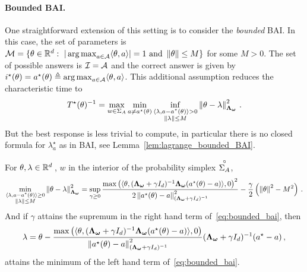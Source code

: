 \paragraph{Bounded BAI.}\label{sec:lgc.formulation.examples.bounded}
One straightforward extension of this setting is to consider the \emph{bounded} BAI. In this case, the set of parameters is $\mathcal{M}=\{\theta \in \mathbb{R}^d:\ |\operatorname*{arg\,max}_{a\in\mathcal{A}} \langle\theta,a\rangle|=1 \text{ and } \left\lVert\theta\right\rVert\leq M\}$ for some $M>0$. The set of possible answers is $\mathcal{I} = \mathcal{A}$ and the correct answer is given by $i^\star(\theta)=a^\star(\theta)\triangleq \operatorname*{arg\,max}_{a\in\mathcal{A}} \langle\theta,a\rangle$.
This additional assumption reduces the characteristic time to
\[
T^{\star}(\theta)^{-1} = \max_{w\in\Sigma_A} \min_{a\neq a^\star(\theta)} \inf_{\substack{\langle \lambda,a-a^\star(\theta)\rangle>0\\ \left\lVert\lambda\right\rVert\leq M}} \left\lVert\theta -\lambda \right\rVert_{{\boldsymbol \Lambda}_{{\boldsymbol \omega}}}^2 \,.
\]
But the best response is less trivial to compute, in particular there is no closed formula for $\lambda^\star_a$ as in BAI, see Lemma~\ref{lem:lagrange_bounded_BAI}.
\begin{lemma}
  \label{lem:lagrange_bounded_BAI}
For $\theta, \lambda \in \mathbb{R}^d\,$, $w$ in the interior of the probability simplex $\overset{\circ}{\Sigma_A}$,
\begin{align}\label{eq:bounded_bai}
\min_{\substack{\langle \lambda,a-a^\star(\theta)\rangle\geq 0\\ \left\lVert\lambda\right\rVert\leq M}} \left\lVert\theta -\lambda \right\rVert_{{\boldsymbol \Lambda}_{{\boldsymbol \omega}}}^2 = \sup_{\gamma\geq 0} \frac{\max\left(\langle \theta, ({\boldsymbol \Lambda}_{{\boldsymbol \omega}}+\gamma I_d)^{-1} {\boldsymbol \Lambda}_{{\boldsymbol \omega}} (a^\star(\theta)-a)\rangle,0\right)^2 }{2\left\lVert a^\star(\theta)-a\right\rVert^2_{({\boldsymbol \Lambda}_{{\boldsymbol \omega}}+\gamma I_d)^{-1}}}- \frac{\gamma}{2}\left(\left\lVert\theta\right\rVert^2-M^2\right)\,.
\end{align}
And if $\gamma$ attains the supremum in the right hand term of~\eqref{eq:bounded_bai}, then
\[
\lambda = \theta - \frac{\max\left(\langle \theta, ({\boldsymbol \Lambda}_{{\boldsymbol \omega}}+\gamma I_d)^{-1} {\boldsymbol \Lambda}_{{\boldsymbol \omega}} (a^\star(\theta)-a)\rangle,0\right)}{\left\lVert a^\star(\theta)-a\right\rVert^2_{({\boldsymbol \Lambda}_{{\boldsymbol \omega}}+\gamma I_d)^{-1}}} ({\boldsymbol \Lambda}_{{\boldsymbol \omega}}+\gamma I_d)^{-1}(a^\star - a)\,,
\]
attains the minimum of the left hand term of~\eqref{eq:bounded_bai}.
\end{lemma}
